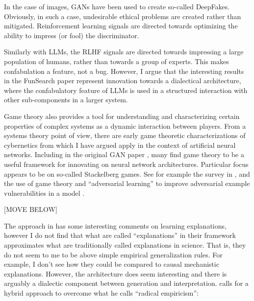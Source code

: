 \documentclass[11pt, oneside]{article}   	%
\begin{document}
In the case of images, GANs have been used to create so-called DeepFakes.  Obviously, in such a case, undesirable ethical problems are created rather than mitigated.  Reinforcement learning signals are directed towards optimizing the ability to impress (or fool) the discriminator.

Similarly with LLMs, the RLHF signals are directed towards impressing a large population of humans, rather than towards a group of experts.  This makes confabulation a feature, not a bug.  However, I argue that the interesting results in the FunSearch paper represent innovation towards a dialectical architecture, where the confabulatory feature of LLMs is used in a structured interaction with other sub-components in a larger system.


Game theory also provides a tool for understanding and characterizing certain properties of complex systems as a dynamic interaction between players.  From a systems theory point of view, there are early game theoretic characterizations of cybernetics from \cite{Ashby1958} which I have argued apply in the context of artificial neural networks.  \citep{Beebe2021}  Including in the original GAN paper \citep{GANS2014}, many find game theory to be a useful framework for innovating on neural network architectures.  Particular focus appears to be on so-called Stackelberg games.  See for example the survey in \citep{GameTheoryDLSurvey2022}, and the use of game theory and ``adversarial learning'' to improve adversarial example vulnerabilities in a model \citep{AdversarialLearning2021}.   







[MOVE BELOW]


The approach in \citep{Norelli2022} has some interesting comments on learning explanations, however I do not find that what are called ``explanations'' in their framework approximates what are traditionally called explanations in science.  That is, they do not seem to me to be above simple empirical generalization rules.  For example, I don't see how they could be compared to causal mechanistic explanations.  However, the architecture does seem interesting and there is arguably a dialectic component between generation and interpretation. \citep{Pearl2021} calls for a hybrid approach to overcome what he calls ``radical empiricism'':
\end{document}
